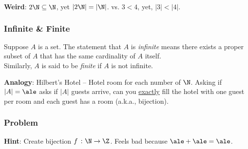         \textbf{Weird}: $2\N \subseteq \N$, yet $|2\N| = |\N|$. vs. $ 3< 4$, yet, $|3| < |4|$. \\

        \subsubsection{Infinite \& Finite}

            \begin{definition}
                Suppose $A$ is a set. The statement that $A$ is \textit{infinite} means there exists a proper subset of $A$ that has the same cardinality of $A$ itself. \\
                Similarly, $A$ is said to be \textit{finite} if $A$ is not infinite.
            \end{definition}

        \textbf{Analogy}: Hilbert's Hotel -- Hotel room for each number of $\N$. Asking if $|A| = \ale$ asks if $|A|$ guests arrive, can you \underline{exactly} fill the hotel with one guest per room and each guest has a room (a.k.a., bijection).

        \subsubsection{Problem}


            \textbf{Hint}: Create bijection $f \ \colon \N \rightarrow \Z$. Feels bad because $\ale + \ale = \ale$.

